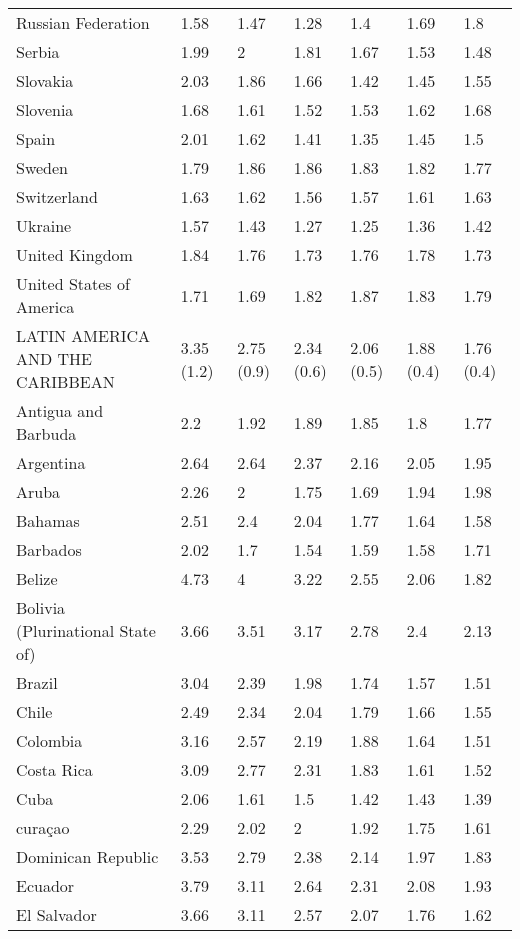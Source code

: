 \begin{longtable}[t]{lllllll}
Russian Federation & 1.58 & 1.47 & 1.28 & 1.4 & 1.69 & 1.8\\
Serbia & 1.99 & 2 & 1.81 & 1.67 & 1.53 & 1.48\\
Slovakia & 2.03 & 1.86 & 1.66 & 1.42 & 1.45 & 1.55\\
Slovenia & 1.68 & 1.61 & 1.52 & 1.53 & 1.62 & 1.68\\
Spain & 2.01 & 1.62 & 1.41 & 1.35 & 1.45 & 1.5\\
Sweden & 1.79 & 1.86 & 1.86 & 1.83 & 1.82 & 1.77\\
Switzerland & 1.63 & 1.62 & 1.56 & 1.57 & 1.61 & 1.63\\
Ukraine & 1.57 & 1.43 & 1.27 & 1.25 & 1.36 & 1.42\\
United Kingdom & 1.84 & 1.76 & 1.73 & 1.76 & 1.78 & 1.73\\
United States of America & 1.71 & 1.69 & 1.82 & 1.87 & 1.83 & 1.79\\
LATIN AMERICA AND THE CARIBBEAN & 3.35 (1.2) & 2.75 (0.9) & 2.34 (0.6) & 2.06 (0.5) & 1.88 (0.4) & 1.76 (0.4)\\
Antigua and Barbuda & 2.2 & 1.92 & 1.89 & 1.85 & 1.8 & 1.77\\
Argentina & 2.64 & 2.64 & 2.37 & 2.16 & 2.05 & 1.95\\
Aruba & 2.26 & 2 & 1.75 & 1.69 & 1.94 & 1.98\\
Bahamas & 2.51 & 2.4 & 2.04 & 1.77 & 1.64 & 1.58\\
Barbados & 2.02 & 1.7 & 1.54 & 1.59 & 1.58 & 1.71\\
Belize & 4.73 & 4 & 3.22 & 2.55 & 2.06 & 1.82\\
Bolivia (Plurinational State of) & 3.66 & 3.51 & 3.17 & 2.78 & 2.4 & 2.13\\
Brazil & 3.04 & 2.39 & 1.98 & 1.74 & 1.57 & 1.51\\
Chile & 2.49 & 2.34 & 2.04 & 1.79 & 1.66 & 1.55\\
Colombia & 3.16 & 2.57 & 2.19 & 1.88 & 1.64 & 1.51\\
Costa Rica & 3.09 & 2.77 & 2.31 & 1.83 & 1.61 & 1.52\\
Cuba & 2.06 & 1.61 & 1.5 & 1.42 & 1.43 & 1.39\\
curaçao & 2.29 & 2.02 & 2 & 1.92 & 1.75 & 1.61\\
Dominican Republic & 3.53 & 2.79 & 2.38 & 2.14 & 1.97 & 1.83\\
Ecuador & 3.79 & 3.11 & 2.64 & 2.31 & 2.08 & 1.93\\
El Salvador & 3.66 & 3.11 & 2.57 & 2.07 & 1.76 & 1.62\\

\end{longtable}
